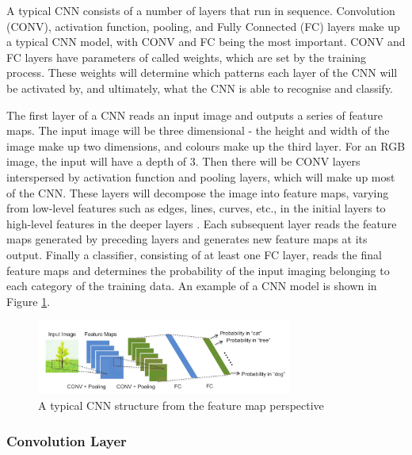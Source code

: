 \documentclass[12pt]{article}
\begin{document}
A typical CNN consists of a number of layers that run in sequence. Convolution (CONV), activation function, pooling, and Fully Connected (FC) layers make up a typical CNN model, with CONV and FC being the most important. CONV and FC layers have parameters of called weights, which are set by the training process. These weights will determine which patterns each layer of the CNN will be activated by, and ultimately, what the CNN is able to recognise and classify. 

The first layer of a CNN reads an input image and outputs a series of feature maps. The input image will be three dimensional - the height and width of the image make up two dimensions, and colours make up the third layer. For an RGB image, the input will have a depth of 3. Then there will be CONV layers interspersed by activation function and pooling layers, which will make up most of the CNN. These layers will decompose the image into feature maps, varying from low-level features such as edges, lines, curves, etc., in the initial layers to high-level features in the deeper layers \cite{SudaFpgaAccelerator}. Each subsequent layer reads the feature maps generated by preceding layers and generates new feature maps at its output. Finally a classifier, consisting of at least one FC layer, reads the final feature maps and determines the probability of the input imaging belonging to each category of the training data. An example of a CNN model is shown in Figure \ref{fig:typicalCNN}.

\begin{figure}[h]
\centering
\includegraphics[width=0.75\textwidth]{figures/typicalCnn}
\caption{A typical CNN structure from the feature map perspective \cite{embeddedFpgaCnn} \label{fig:typicalCNN}}
\end{figure}


\subsubsection{Convolution Layer}
\label{sec:Background-CNN-Conv}
\end{document}
